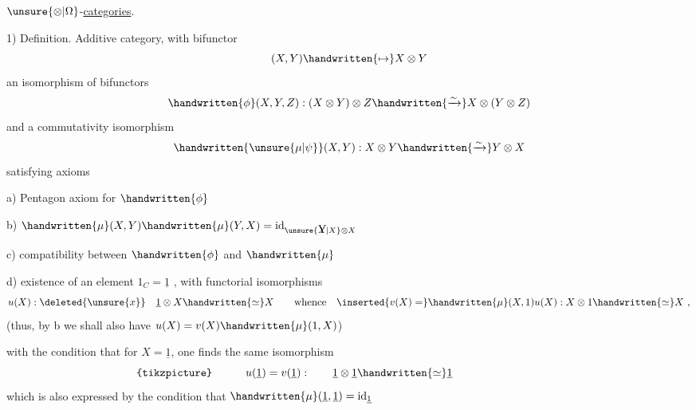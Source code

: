 

$\unsure{\otimes|\Omega}$-\uline{categories}.

1) Definition.  Additive category, with bifunctor
\[
(X,Y)\handwritten{\mapsto}X\otimes Y
\]
 an  isomorphism of bifunctors
\[
\handwritten{\phi}(X,Y,Z): (X\otimes Y)\otimes Z\handwritten{\xrightarrow{\sim}}X\otimes(Y\otimes Z)
\]
and a commutativity isomorphism
\[
\handwritten{\unsure{\mu|\psi}}(X,Y): X\otimes Y\handwritten{\xrightarrow{\sim}}Y\otimes X
\]
satisfying axioms

a) Pentagon axiom for $\handwritten{\phi}$ 

b) $\handwritten{\mu}(X,Y)\handwritten{\mu}(Y,X)=\mathrm{id}_{\unsure{\rlap{Y}X|X}\otimes X}$ \handwritten{;}

c) compatibility between $\handwritten{\phi}$ and $\handwritten{\mu}$ 

d) existence of an element $1_C=\underline{1}$ , with functorial isomorphisms
\[
u(X):\deleted{\unsure{x}}\quad\underline{1}\otimes X\handwritten{\simeq}X
\qquad\text{whence}\quad
\inserted{v(X)=}\handwritten{\mu}(X,1)u(X): X\otimes1\handwritten{\simeq}X\ ,
\]
(thus, by b we shall also have $u(X)=v(X)\handwritten{\mu}(1,X)$)

with the condition that for $X=\underline{1}$, one finds the same isomorphism
\[
\makebox[0pt][r]{\begin{tikzpicture}[x=1em,y=1em]\fill (0,0) circle (.045);\end{tikzpicture}\hspace{3em}}
u(\underline{1})=v(\underline{1}) :\qquad \underline{1}\otimes\underline{1}\handwritten{\simeq}\underline{1}
\]
which is also expressed by the condition that $\handwritten{\mu}(\underline{1},\underline{1})=\mathrm{id}_{\underline{1}}$ \handwritten{;}

